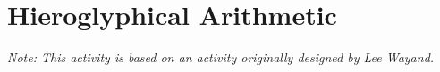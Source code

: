 \newpage
\section{Hieroglyphical Arithmetic}\label{A:HAr}
\emph{Note: This activity is based on an activity originally designed by Lee Wayand.}



\newcommand{\lo}{\vcenter{\hbox{\textproto{a}}}}
\newcommand{\loo}{\vcenter{\hbox{\textproto{d}}}}
\newcommand{\la}{\vcenter{\hbox{\textproto{w}}}}
\newcommand{\lb}{\vcenter{\hbox{\textproto{H}}}}
\newcommand{\lc}{\vcenter{\hbox{\textproto{T}}}}
\newcommand{\ld}{\vcenter{\hbox{\textproto{K}}}}
\newcommand{\lf}{\vcenter{\hbox{\textproto{E}}}}
\newcommand{\lh}{\vcenter{\hbox{\textproto{l}}}}
\newcommand{\li}{\vcenter{\hbox{\textproto{o}}}}
\newcommand{\lx}{\vcenter{\hbox{\textproto{x}}}}
\newcommand{\ly}{\vcenter{\hbox{\textproto{R}}}}
\newcommand{\lz}{\vcenter{\hbox{\textproto{v}}}}
\newcommand{\lw}{\vcenter{\hbox{\textproto{q}}}}


